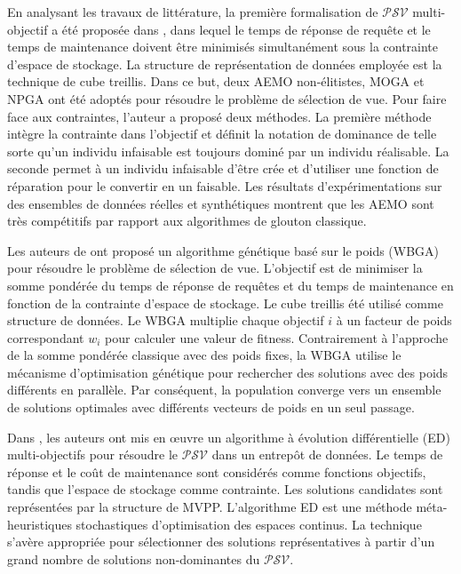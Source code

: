 En analysant les travaux de littérature, la première formalisation de $\mathcal{PSV}$ multi-objectif a été proposée dans \cite{Lawrence06}, dans lequel le temps de réponse de requête et le temps de maintenance doivent être minimisés simultanément sous la contrainte d'espace de stockage. La structure de représentation de données employée est la technique de cube treillis. Dans ce but, deux AEMO non-élitistes, MOGA et NPGA ont été adoptés pour résoudre le problème de sélection de vue. Pour faire face aux contraintes, l'auteur a proposé deux méthodes. La première méthode intègre la contrainte dans l'objectif et définit la notation de dominance de telle sorte qu'un individu infaisable est toujours dominé par un individu réalisable. La seconde permet à un individu infaisable d'être crée et d'utiliser une fonction de réparation pour le convertir en un faisable. Les résultats d'expérimentations sur des ensembles de données réelles et synthétiques montrent que les AEMO sont très compétitifs par rapport aux algorithmes de glouton classique.

Les auteurs de \cite{Talebian13} ont proposé un algorithme génétique basé sur le poids (WBGA) pour résoudre le problème de sélection de vue. L'objectif est de minimiser la somme pondérée du temps de réponse de requêtes et du temps de maintenance en fonction de la contrainte d'espace de stockage. Le cube treillis été utilisé comme structure de données. Le WBGA multiplie chaque objectif $i$ à un facteur de poids correspondant $w_i$ pour calculer une valeur de fitness. Contrairement à l'approche de la somme pondérée classique avec des poids fixes, la WBGA utilise le mécanisme d'optimisation génétique pour rechercher des solutions avec des poids différents en parallèle. Par conséquent, la population converge vers un ensemble de solutions optimales avec différents vecteurs de poids en un seul passage.

Dans \cite{Goswami13}, les auteurs ont mis en œuvre un algorithme à évolution différentielle (ED) multi-objectifs pour résoudre le $\mathcal{PSV}$ dans un entrepôt de données. Le temps de réponse et le coût de maintenance sont considérés comme fonctions objectifs, tandis que l'espace de stockage comme contrainte. Les solutions candidates sont représentées par la structure de MVPP. L'algorithme ED est une méthode méta-heuristiques stochastiques d'optimisation des espaces continus. La technique s'avère appropriée pour sélectionner des solutions représentatives à partir d'un grand nombre de solutions non-dominantes du $\mathcal{PSV}$.

